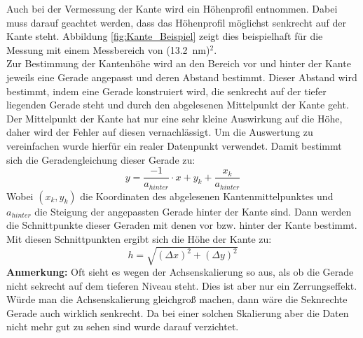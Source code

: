 \documentclass[12pt,a4paper]{article}
\begin{document}
Auch bei der Vermessung der Kante wird ein Höhenprofil entnommen. Dabei muss darauf geachtet werden, dass das Höhenprofil möglichst senkrecht auf der Kante steht. Abbildung \ref{fig:Kante_Beispiel} zeigt dies beispielhaft für die Messung mit einem Messbereich von (\SI{13,2}{nm})$^2$.\\
Zur Bestimmung der Kantenhöhe wird an den Bereich vor und hinter der Kante jeweils eine Gerade angepasst und deren Abstand bestimmt. Dieser Abstand wird bestimmt, indem eine Gerade konstruiert wird, die senkrecht auf der tiefer liegenden Gerade steht und durch den abgelesenen Mittelpunkt der Kante geht.
Der Mittelpunkt der Kante hat nur eine sehr kleine Auswirkung auf die Höhe, daher wird der Fehler auf diesen vernachlässigt. Um die Auswertung zu vereinfachen wurde hierfür ein realer Datenpunkt verwendet. Damit bestimmt sich die Geradengleichung dieser Gerade zu:
\begin{equation*}
y = \dfrac{-1}{a_{hinter}} \cdot x + y_k + \dfrac{x_k}{a_{hinter}}
\end{equation*}
Wobei $(x_k, y_k)$ die Koordinaten des abgelesenen Kantenmittelpunktes und $a_{hinter}$ die Steigung der angepassten Gerade hinter der Kante sind. Dann werden die Schnittpunkte dieser Geraden mit denen vor bzw. hinter der Kante bestimmt. Mit diesen Schnittpunkten ergibt sich die Höhe der Kante zu:
\begin{equation*}
h = \sqrt{(\Delta x)^2 + (\Delta y)^2}
\end{equation*}
\textbf{Anmerkung:} Oft sieht es wegen der Achsenskalierung so aus, als ob die Gerade nicht sekrecht auf dem tieferen Niveau steht. Dies ist aber nur ein Zerrungseffekt. Würde man die Achsenskalierung gleichgroß machen, dann wäre die Seknrechte Gerade auch wirklich senkrecht. Da bei einer solchen Skalierung aber die Daten nicht mehr gut zu sehen sind wurde darauf verzichtet.\\
\\
\end{document}
